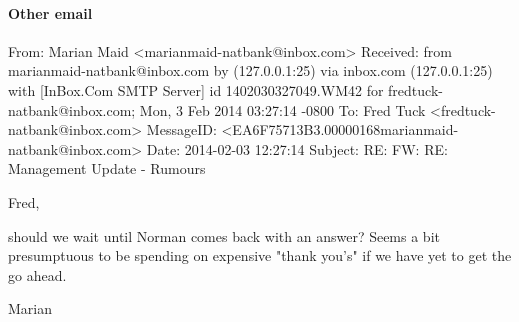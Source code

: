\paragraph{Other email}
\label{Others}
\begin{spverbatim}
From: Marian Maid <marianmaid-natbank@inbox.com>
Received: from marianmaid-natbank@inbox.com by (127.0.0.1:25) via inbox.com
  (127.0.0.1:25) with [InBox.Com SMTP Server] id 1402030327049.WM42 for
  fredtuck-natbank@inbox.com; Mon, 3 Feb 2014 03:27:14 -0800
To: Fred Tuck <fredtuck-natbank@inbox.com>
MessageID: <EA6F75713B3.00000168marianmaid-natbank@inbox.com>
Date: 2014-02-03 12:27:14
Subject: RE: FW: RE: Management Update - Rumours

Fred,

should we wait until Norman comes back with an answer? Seems a bit presumptuous to be spending on expensive "thank you's" if we have yet to get the go ahead.

Marian


\end{spverbatim}
